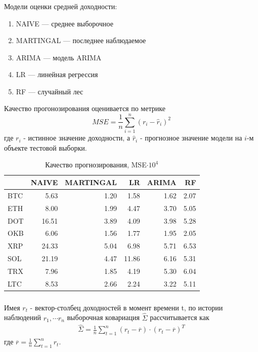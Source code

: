 \documentclass{beamer}
\begin{document}
\begin{frame}
    \frametitle{}
    Модели оценки средней доходности:
    \begin{enumerate}
        \item NAIVE --- среднее выборочное
        \item MARTINGAL --- последнее наблюдаемое
        \item ARIMA --- модель ARIMA
        \item LR --- линейная регрессия
        \item RF --- случайный лес
    \end{enumerate}

    Качество прогонозирования оценивается по метрике 
    \[
	MSE = \frac{1}{n} \sum_{i=1}^{n} (r_i - \hat{r}_i)^2
    \]
    где $r_i$ - истинное значение доходности,
    а $\hat{r}_i$ - прогнозное значение модели на $i$-м объекте тестовой выборки.
\end{frame}

\begin{frame}
    \begin{table}[h]
    \caption{Качество прогнозирования, MSE$\cdot 10^4$}
        \label{tab:ml_eval_metrics}
        \begin{tabular}{lrrrrr}
            \toprule
            & NAIVE & MARTINGAL & LR & ARIMA & RF \\
            \midrule
            BTC & 5.63 & 1.20 & 1.58 & 1.62 & 2.07 \\
            ETH & 8.00 & 1.99 & 4.47 & 3.70 & 5.05 \\
            DOT & 16.51 & 3.89 & 4.09 & 3.98 & 5.28 \\
            OKB & 6.06 & 1.56 & 1.77 & 1.95 & 2.05 \\
            XRP & 24.33 & 5.04 & 6.98 & 5.71 & 6.53 \\
            SOL & 21.19 & 4.47 & 11.86 & 6.16 & 5.31 \\
            TRX & 7.96 & 1.85 & 4.19 & 5.30 & 6.04 \\
            LTC & 8.53 & 2.66 & 2.24 & 3.22 & 5.11 \\
            \bottomrule
        \end{tabular}
    \end{table}
\end{frame}

\begin{frame}
    \frametitle{}
    Имея $r_t$ - вектор-столбец доходностей в момент времени t, по истории наблюдений $r_1, \cdots r_n$ 
    выборочная ковариация $\hat{\Sigma}$ рассчитывается как 
    \begin{align}
        \hat{\Sigma} = \frac{1}{n} \sum_{t=1}^{n}(r_t - \overline{r}) \cdot (r_t - \overline{r})^T
    \end{align}
    где $\overline{r} = \frac{1}{n} \sum_{t=1}^{n} r_t$.    
\end{frame}
\end{document}
